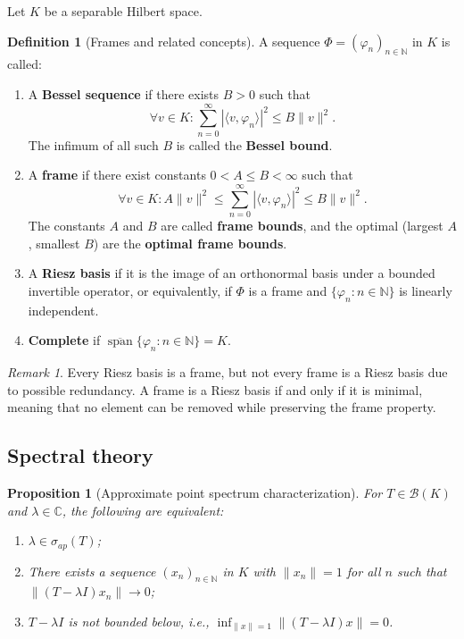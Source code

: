 \documentclass[a4paper,11pt]{article}
\theoremstyle{plain}
\newtheorem{proposition}[theorem]{Proposition}
\theoremstyle{definition}
\newtheorem{definition}[theorem]{Definition}
\theoremstyle{remark}
\newtheorem{remark}[theorem]{Remark}
\DeclareMathOperator{\Span}{span}
\begin{document}
Let $K$ be a separable Hilbert space.

\begin{definition}[Frames and related concepts]
\label{DefFrame}
A sequence $\Phi = (\varphi_n)_{n \in \mathbb{N}}$ in $K$ is called:
\begin{enumerate}[label=(\alph*)]
\item A \textbf{Bessel sequence} if there exists $B > 0$ such that
\[\forall v \in K : \sum_{n=0}^{\infty} |\langle v, \varphi_n \rangle|^2 \leq B \|v\|^2.\]
The infimum of all such $B$ is called the \textbf{Bessel bound}.

\item A \textbf{frame} if there exist constants $0 < A \leq B < \infty$ such that
\[\forall v \in K : A\|v\|^2 \leq \sum_{n=0}^{\infty} |\langle v, \varphi_n \rangle|^2 \leq B\|v\|^2.\]
The constants $A$ and $B$ are called \textbf{frame bounds}, and the optimal (largest $A$, smallest $B$) are the \textbf{optimal frame bounds}.

\item A \textbf{Riesz basis} if it is the image of an orthonormal basis under a bounded invertible operator, or equivalently, if $\Phi$ is a frame and $\{\varphi_n : n \in \mathbb{N}\}$ is linearly independent.

\item \textbf{Complete} if $\overline{\Span}\{\varphi_n : n \in \mathbb{N}\} = K$.
\end{enumerate}
\end{definition}

\begin{remark}
Every Riesz basis is a frame, but not every frame is a Riesz basis due to possible redundancy. A frame is a Riesz basis if and only if it is minimal, meaning that no element can be removed while preserving the frame property.
\end{remark}


\subsection{Spectral theory}

\begin{proposition}[Approximate point spectrum characterization]
\label{PropApproxSpecCharac}
For $T \in \mathcal{B}(K)$ and $\lambda \in \mathbb{C}$, the following are equivalent:
\begin{enumerate}[label=(\roman*)]
\item $\lambda \in \sigma_{ap}(T)$;
\item There exists a sequence $(x_n)_{n \in \mathbb{N}}$ in $K$ with $\|x_n\| = 1$ for all $n$ such that $\|(T - \lambda I)x_n\| \to 0$;
\item $T - \lambda I$ is not bounded below, i.e., $\inf_{\|x\|=1} \|(T-\lambda I)x\| = 0$.
\end{enumerate}
\end{proposition}
\end{document}
